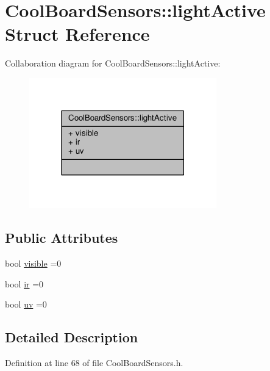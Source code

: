\hypertarget{struct_cool_board_sensors_1_1light_active}{}\section{Cool\+Board\+Sensors\+:\+:light\+Active Struct Reference}
\label{struct_cool_board_sensors_1_1light_active}


Collaboration diagram for Cool\+Board\+Sensors\+:\+:light\+Active\+:\nopagebreak
\begin{figure}[H]
\begin{center}
\leavevmode
\includegraphics[width=230pt]{de/d9f/struct_cool_board_sensors_1_1light_active__coll__graph}
\end{center}
\end{figure}
\subsection*{Public Attributes}
\begin{DoxyCompactItemize}
\item 
bool \hyperlink{struct_cool_board_sensors_1_1light_active_a9c351100969d0dc055ad2e6712cc7ac8}{visible} =0
\item 
bool \hyperlink{struct_cool_board_sensors_1_1light_active_a4c21258d3c89c6292740d6deb10f9dcc}{ir} =0
\item 
bool \hyperlink{struct_cool_board_sensors_1_1light_active_a0e6cfc311425a31f32c32fc3b834ffb8}{uv} =0
\end{DoxyCompactItemize}


\subsection{Detailed Description}


Definition at line 68 of file Cool\+Board\+Sensors.\+h.



